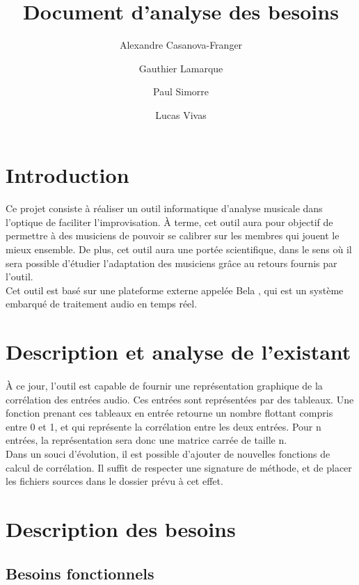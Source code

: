 \documentclass{article}
\title{Document d'analyse des besoins}
\author{Alexandre Casanova-Franger\\
        \and
        Gauthier Lamarque\\
        \and
        Paul Simorre\\
        \and
        Lucas Vivas\\}
\begin{document}
  \maketitle
  \section{Introduction}
    \paragraph{}
    Ce projet consiste à réaliser un outil informatique d'analyse musicale dans
    l'optique de faciliter l'improvisation. À terme, cet outil aura pour
    objectif de permettre à des musiciens de pouvoir se calibrer sur les membres
    qui jouent le mieux ensemble. De plus, cet outil aura une portée
    scientifique, dans le sens où il sera possible d'étudier l'adaptation des
    musiciens grâce au retours fournis par l'outil. \\
    Cet outil est basé sur une plateforme externe appelée Bela \cite{BELA},
    qui est un système embarqué de traitement audio en temps réel.
  \section{Description et analyse de l'existant}
    \paragraph{}
    À ce jour, l'outil est capable de fournir une représentation graphique de la
    corrélation des entrées audio. Ces entrées sont représentées par des
    tableaux. Une fonction prenant ces tableaux en entrée
    retourne un nombre flottant compris entre 0 et 1, et qui représente la
    corrélation entre les deux entrées. Pour n entrées, la représentation sera
    donc une matrice carrée de taille n.\\
    Dans un souci d'évolution, il est possible d'ajouter de nouvelles fonctions
    de calcul de corrélation. Il suffit de respecter une signature de méthode,
    et de placer les fichiers sources dans le dossier prévu à cet effet.\\
  \section{Description des besoins}
    \subsection{Besoins fonctionnels}
\end{document}
